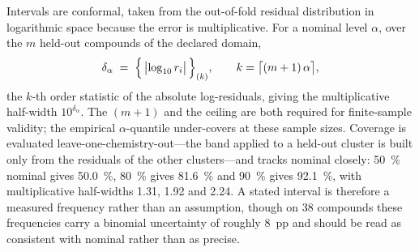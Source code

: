 Intervals are conformal, taken from the out-of-fold residual distribution in logarithmic space
because the error is multiplicative. For a nominal level $\alpha$, over the $m$ held-out compounds
of the declared domain,
%
\begin{equation}
  \delta_\alpha \;=\; \Bigl\{\, \bigl|\log_{10} r_i \bigr| \,\Bigr\}_{(k)},
  \qquad k = \bigl\lceil (m+1)\,\alpha \bigr\rceil,
  \label{eq:conformal}
\end{equation}
%
the $k$-th order statistic of the absolute log-residuals, giving the multiplicative half-width
$10^{\delta_\alpha}$. The $(m+1)$ and the ceiling are both required for finite-sample validity;
the empirical $\alpha$-quantile under-covers at these sample sizes. Coverage is evaluated
leave-one-chemistry-out---the band applied to a held-out cluster is built only from the residuals
of the other clusters---and tracks nominal closely: \SI{50}{\percent} nominal gives
\SI{50.0}{\percent}, \SI{80}{\percent} gives \SI{81.6}{\percent} and \SI{90}{\percent} gives
\SI{92.1}{\percent}, with multiplicative half-widths \num{1.31}, \num{1.92} and \num{2.24}. A
stated interval is therefore a measured frequency rather than an assumption, though on \num{38}
compounds these frequencies carry a binomial uncertainty of roughly \SI{8}{pp} and should be read
as consistent with nominal rather than as precise.
